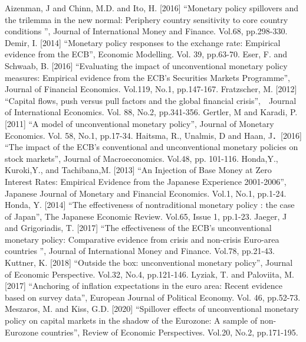 \documentclass[12pt]{article}
\begin{document}
\begin{thebibliography}{99}
    
    \bibitem{} Aizenman, J and Chinn, M.D. and Ito, H. [2016] “Monetary policy spillovers and the
    trilemma in the new normal: Periphery country sensitivity to core country conditions
    ”, Journal of International Money and Finance. Vol.68, pp.298-330.
    \bibitem{} Demir, I. [2014] “Monetary policy responses to the exchange rate: Empirical evidence
    from the ECB”, Economic Modelling. Vol. 39, pp.63-70.
    \bibitem{} Eser, F. and Schwaab, B. [2016] “Evaluating the impact of unconventional monetary
    policy measures: Empirical evidence from the ECB's Securities Markets Programme”, Journal of Financial Economics. Vol.119, No.1, pp.147-167.
    \bibitem{} Fratzscher, M. [2012] “Capital flows, push versus pull factors and the global financial
    crisis”,　Journal of International Economics. Vol. 88, No.2, pp.341-356.
    \bibitem{} Gertler, M and Karadi, P. [2011] “A model of unconventional monetary policy”,
    Journal of Monetary Economics. Vol. 58, No.1, pp.17-34.
    \bibitem{} Haitsma, R., Unalmis, D and Haan, J．[2016] “The impact of the ECB's conventional
    and unconventional monetary policies on stock markets”, Journal of Macroeconomics.
    Vol.48, pp. 101-116.
    \bibitem{} Honda,Y., Kuroki,Y., and Tachibana,M. [2013] “An Injection of Base Money at
    Zero Interest Rates: Empirical Evidence from the Japanese Experience 2001-2006”,
    Japanese Journal of Monetary and Financial Economics. Vol.1, No.1, pp.1-24.
    \bibitem{} Honda, Y. [2014] “The effectiveness of nontraditional monetary policy : the case of
    Japan”, The Japanese Economic Review. Vol.65, Issue 1, pp.1-23.
    \bibitem{} Jaeger, J and Grigoriadis, T. [2017] “The effectiveness of the ECB's unconventional
    monetary policy: Comparative evidence from crisis and non-crisis Euro-area countries
    ”, Journal of International Money and Finance. Vol.78, pp.21-43.
    \bibitem{} Kuttner, K. [2018] “Outside the box: unconventional monetary policy”, Journal of
    Economic Perspective. Vol.32, No.4, pp.121-146.
    \bibitem{} Lyziak, T. and Paloviita, M. [2017] “Anchoring of inflation expectations in the
    euro area: Recent evidence based on survey data”, European Journal of Political
    Economy. Vol. 46, pp.52-73.
    \bibitem{} Meszaros, M. and Kiss, G.D. [2020] “Spillover effects of unconventional monetary
    policy on capital markets in the shadow of the Eurozone: A sample of non-Eurozone
    countries”, Review of Economic Perspectives. Vol.20, No.2, pp.171-195.

\end{thebibliography}
\end{document}
